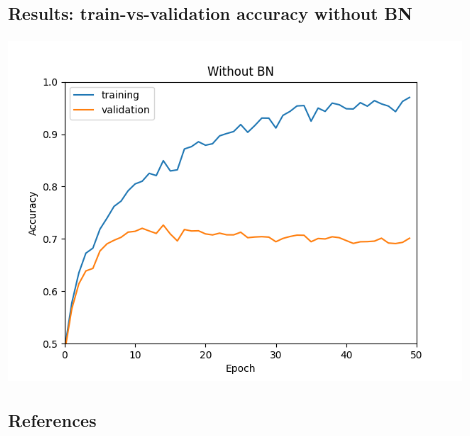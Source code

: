 \documentclass{beamer}
\begin{document}
\begin{frame}
    \frametitle{Results: train-vs-validation accuracy without BN}
    \begin{center}
        \includegraphics[width=0.9\textwidth]{figs/accuracy-t-vs-v-woBN.png}
    \end{center}
\end{frame}

\begin{frame}
    \frametitle{References}
\nocite{*}    
\printbibliography
\end{frame}
\end{document}
